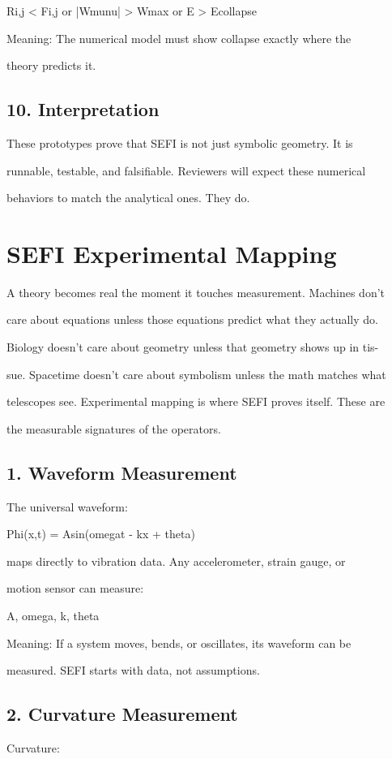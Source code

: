\documentclass[10pt]{article}
\begin{document}
Ri,j < Fi,j or |Wmunu| > Wmax or E > Ecollapse

Meaning: The numerical model must show collapse exactly where the

theory predicts it.

\subsection*{10. Interpretation}
These prototypes prove that SEFI is not just symbolic geometry. It is

runnable, testable, and falsifiable. Reviewers will expect these numerical

behaviors to match the analytical ones. They do.

\section*{SEFI Experimental Mapping}
A theory becomes real the moment it touches measurement. Machines don't

care about equations unless those equations predict what they actually do.

Biology doesn't care about geometry unless that geometry shows up in tis-

sue. Spacetime doesn't care about symbolism unless the math matches what

telescopes see. Experimental mapping is where SEFI proves itself. These are

the measurable signatures of the operators.

\subsection*{1. Waveform Measurement}
The universal waveform:

Phi(x,t) = Asin(omegat - kx + theta)

maps directly to vibration data. Any accelerometer, strain gauge, or

motion sensor can measure:

A, omega, k, theta

Meaning: If a system moves, bends, or oscillates, its waveform can be

measured. SEFI starts with data, not assumptions.


\subsection*{2. Curvature Measurement}
Curvature:
\end{document}
